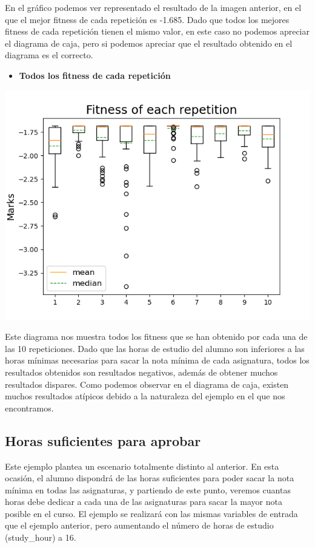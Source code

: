 \documentclass[11pt, a4paper, titlepage]{article}
\begin{document}
En el gráfico podemos ver representado el resultado de la imagen anterior, en el que el mejor fitness de cada repetición es -1.685. Dado que todos los mejores fitness de cada repetición tienen el mismo valor, en este caso no podemos apreciar el diagrama de caja, pero si podemos apreciar que el resultado obtenido en el diagrama es el correcto.

\begin{itemize}
\item \textbf{Todos los fitness de cada repetición}
\end{itemize}

\includegraphics[scale=0.6]{img/grafica2_horinsuf}

Este diagrama nos muestra todos los fitness que se han obtenido por cada una de las 10 repeticiones. Dado que las horas de estudio del alumno son inferiores a las horas mínimas necesarias para sacar la nota mínima de cada asignatura, todos los resultados obtenidos son resultados negativos, además de obtener muchos resultados dispares. Como podemos observar en el diagrama de caja, existen muchos resultados atípicos debido a la naturaleza del ejemplo en el que nos encontramos.

\subsection{Horas suficientes para aprobar}
Este ejemplo plantea un escenario totalmente distinto al anterior. En esta ocasión, el alumno dispondrá de las horas suficientes para poder sacar la nota mínima en todas las asignaturas, y partiendo de este punto, veremos cuantas horas debe dedicar a cada una de las asignaturas para sacar la mayor nota posible en el curso. El ejemplo se realizará con las mismas variables de entrada que el ejemplo anterior, pero aumentando el número de horas de estudio (study\_hour) a 16.
\end{document}
